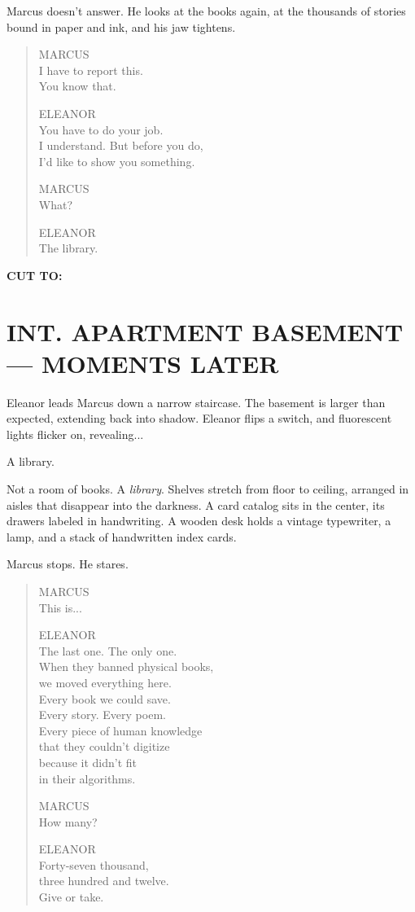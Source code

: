\documentclass[
    language=english,
    doctype=screenplay,
    institution=none,
]{../../omnilatex}
\begin{document}
Marcus doesn't answer. He looks at the books again, at the thousands of stories bound in paper and ink, and his jaw tightens.

\begin{quote}
MARCUS\\
I have to report this.\\
You know that.

ELEANOR\\
You have to do your job.\\
I understand. But before you do,\\
I'd like to show you something.

MARCUS\\
What?

ELEANOR\\
The library.
\end{quote}

\begin{center}
\textbf{CUT TO:}
\end{center}

\section*{INT. APARTMENT BASEMENT --- MOMENTS LATER}

Eleanor leads Marcus down a narrow staircase. The basement is larger than expected, extending back into shadow. Eleanor flips a switch, and fluorescent lights flicker on, revealing...

A library.

Not a room of books. A \textit{library}. Shelves stretch from floor to ceiling, arranged in aisles that disappear into the darkness. A card catalog sits in the center, its drawers labeled in handwriting. A wooden desk holds a vintage typewriter, a lamp, and a stack of handwritten index cards.

Marcus stops. He stares.

\begin{quote}
MARCUS\\
This is...

ELEANOR\\
The last one. The only one.\\
When they banned physical books,\\
we moved everything here.\\
Every book we could save.\\
Every story. Every poem.\\
Every piece of human knowledge\\
that they couldn't digitize\\
because it didn't fit\\
in their algorithms.

MARCUS\\
How many?

ELEANOR\\
Forty-seven thousand,\\
three hundred and twelve.\\
Give or take.
\end{quote}
\end{document}

